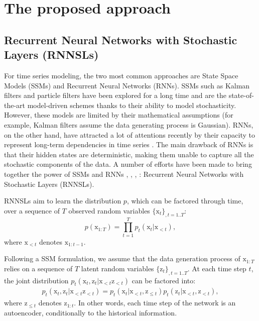 \documentclass{article}
\begin{document}
  \section{The proposed approach}
\label{secArchitecture}

\subsection{Recurrent Neural Networks with Stochastic Layers (RNNSLs)}
\label{secRNNSLs}

For time series modeling, the two most common approaches are State Space Models (SSMs) and Recurrent Neural Networks (RNNs). SSMs such as Kalman filters \cite{brown_introduction_nodate} and particle filters \cite{doucet_tutorial_nodate} have been explored for a long time and are the state-of-the-art model-driven schemes thanks to their ability to model stochasticity. However, these models are limited  by their mathematical assumptions (for example, Kalman filters assume the data generating process is Gaussian). RNNs, on the other hand, have attracted a lot of attentions recently by their capacity to represent long-term dependencies in time series \cite{lecun_deep_2015}. The main drawback of RNNs is that their hidden states are deterministic, making them unable to capture all the stochastic components of the data.
A number of efforts have been made to bring together the power of SSMs and RNNs
\cite{bayer_learning_2014}, \cite{chung_recurrent_2015}, \cite{fraccaro_sequential_2016}, \cite{krishnan_deep_2017}: Recurrent Neural Networks with Stochastic Layers (RNNSLs). 


RNNSLs aim to learn the distribution $p$, which can be factored through time, over a sequence of $T$ observed random variables $\{ \boldsymbol{\mathrm{x}}_{t} \} _{, t = 1..T}$:
\begin{equation}
p(\boldsymbol{\mathrm{x}}_{1:T}) = \prod_{t=1}^T p_t(\boldsymbol{\mathrm{x}}_t|\boldsymbol{\mathrm{x}}_{<t}),
\end{equation}
where $\boldsymbol{\mathrm{x}}_{<t}$ denotes $\boldsymbol{\mathrm{x}}_{1:t-1}$.



Following a SSM formulation, we assume that the data generation process of $\boldsymbol{\mathrm{x}}_{1:T}$ relies on a sequence of $T$ latent random variables $\{ \boldsymbol{\mathrm{z}}_{t} \} _{, t = 1..T}$.
At each time step $t$, the joint distribution $p_t(\boldsymbol{\mathrm{x}}_t,\boldsymbol{\mathrm{z}}_t|\boldsymbol{\mathrm{x}}_{<t}\boldsymbol{\mathrm{z}}_{<t})$ can be factored into:
\begin{multline}
p_t(\boldsymbol{\mathrm{x}}_t,\boldsymbol{\mathrm{z}}_t|\boldsymbol{\mathrm{x}}_{<t}\boldsymbol{\mathrm{z}}_{<t}) = p_t(\boldsymbol{\mathrm{x}}_t|\boldsymbol{\mathrm{x}}_{<t},\boldsymbol{\mathrm{z}}_{\leq t})p_t(\boldsymbol{\mathrm{z}}_t|\boldsymbol{\mathrm{x}}_{<t},\boldsymbol{\mathrm{z}}_{<t}), 
\end{multline}
where $\boldsymbol{\mathrm{z}}_{\leq t}$ denotes $\boldsymbol{\mathrm{z}}_{1:t}$. In other words, each time step of the network is an autoencoder, conditionally to the historical information.
\end{document}
